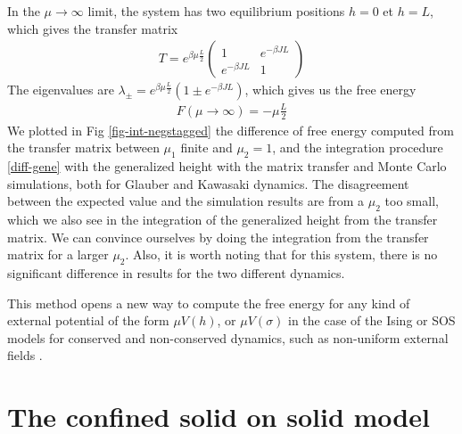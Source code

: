 {In the $\mu \rightarrow \infty$ limit, the system has two equilibrium positions $h=0$ et $h=L$, which gives the transfer matrix
\begin{align}
T= e^{\beta \mu \frac{L}{2}}
  \begin{pmatrix}
    1 & e^{-\beta  J L} \\
    e^{-\beta  J L} & 1
  \end{pmatrix}
\end{align}
The eigenvalues are $\lambda_\pm = e^{ \beta \mu \frac{L}{2}}( 1 \pm e^{-\beta J L})$, which gives us the free energy 
\begin{align}
  F(\mu \rightarrow \infty) = - \mu \frac{L}{2}
\end{align}
We plotted in Fig \ref{fig-int-negstagged} the difference of free energy computed from the transfer matrix between $\mu_1$ finite and $\mu_2=1$, and the integration procedure \eqref{diff-gene} with the generalized height with the matrix transfer and Monte Carlo simulations, both for Glauber and Kawasaki dynamics. The disagreement between the expected value and the simulation results are from a $\mu_2$ too small, which we also see in the integration of the generalized height from the transfer matrix. We can convince ourselves by doing the integration from the transfer matrix for a larger $\mu_2$. Also, it is worth noting that for this system, there is no significant difference in results for the two different dynamics.

This method opens a new way to compute the free energy for any kind of external potential of the form $\mu V(h)$, or $\mu V(\sigma)$ in the case of the Ising or SOS models for conserved and non-conserved dynamics, such as non-uniform external fields \cite{bissacot_phase_2010}. 
}


\section{The confined solid on solid model}

